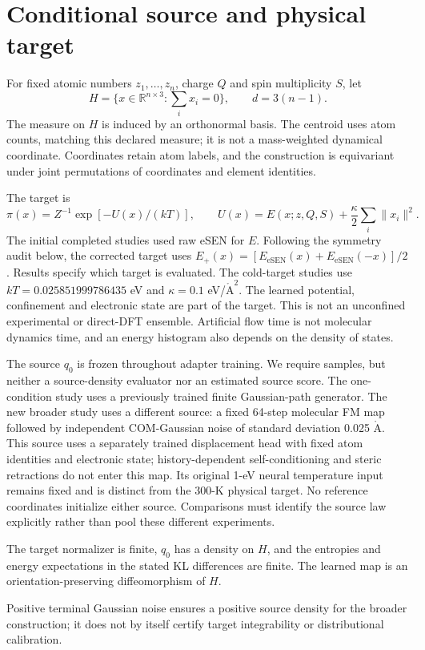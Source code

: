 \section{Conditional source and physical target}
For fixed atomic numbers $z_1,\ldots,z_n$, charge $Q$ and spin multiplicity $S$,
let
\[
 H=\{x\in\mathbb R^{n\times3}:\textstyle\sum_i x_i=0\},
 \qquad d=3(n-1).
\]
The measure on $H$ is induced by an orthonormal basis. The centroid uses atom
counts, matching this declared measure; it is not a mass-weighted dynamical
coordinate. Coordinates retain atom labels, and the construction is equivariant
under joint permutations of coordinates and element identities.

The target is
\begin{equation}
 \pi(x)=Z^{-1}\exp[-U(x)/(kT)],\qquad
 U(x)=E(x;z,Q,S)+\frac{\kappa}{2}\sum_i\|x_i\|^2.
 \label{eq:refine-target}
\end{equation}
The initial completed studies used raw eSEN for $E$. Following the symmetry
audit below, the corrected target uses
$E_+(x)=[E_{\mathrm{eSEN}}(x)+E_{\mathrm{eSEN}}(-x)]/2$.
Results specify which target is evaluated. The cold-target studies use
$kT=0.025851999786435$ eV and
$\kappa=0.1$ eV/$\mathrm{\mathring A}^2$. The learned potential, confinement
and electronic state are part of the target. This is not an unconfined
experimental or direct-DFT ensemble. Artificial flow time is not molecular
dynamics time, and an energy histogram also depends on the density of states.

The source $q_0$ is frozen throughout adapter training. We require samples,
but neither a source-density evaluator nor an estimated source score. The
one-condition study uses a previously trained finite Gaussian-path generator.
The new broader study uses a different source: a fixed 64-step molecular FM
map followed by independent COM-Gaussian noise of standard deviation 0.025
$\mathrm{\mathring A}$. This source uses a separately trained displacement
head with fixed atom identities and electronic state; history-dependent
self-conditioning and steric retractions do not enter this map.
Its original 1-eV neural temperature input remains
fixed and is distinct from the 300-K physical target. No reference coordinates
initialize either source. Comparisons must identify the source law explicitly
rather than pool these different experiments.

\begin{assumption}
The target normalizer is finite, $q_0$ has a density on $H$, and the entropies
and energy expectations in the stated KL differences are finite. The learned
map is an orientation-preserving diffeomorphism of $H$.
\label{ass:refinement}
\end{assumption}
Positive terminal Gaussian noise ensures a positive source density for the
broader construction; it does not by itself certify target integrability or
distributional calibration.

